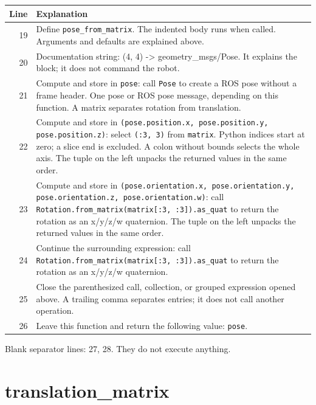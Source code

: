 \documentclass[11pt,a4paper]{book}
\begin{document}
\begin{longtable}{r p{}}

\textbf{Line} & \textbf{Explanation} \\ \hline \endhead

19 & Define \texttt{pose\_from\_matrix}. The indented body runs when called. Arguments and defaults are explained above. \\

20 & Documentation string: (4, 4) -> geometry\_msgs/Pose. It explains the block; it does not command the robot. \\

21 & Compute and store in \texttt{pose}: call \texttt{Pose} to create a ROS pose without a frame header. One pose or ROS pose message, depending on this function. A matrix separates rotation from translation. \\

22 & Compute and store in \texttt{(pose.position.x, pose.position.y, pose.position.z)}: select \texttt{(:3, 3)} from \texttt{matrix}. Python indices start at zero; a slice end is excluded. A colon without bounds selects the whole axis. The tuple on the left unpacks the returned values in the same order. \\

23 & Compute and store in \texttt{(pose.orientation.x, pose.orientation.y, pose.orientation.z, pose.orientation.w)}: call \texttt{Rotation.from\_matrix(matrix[:3, :3]).as\_quat} to return the rotation as an x/y/z/w quaternion. The tuple on the left unpacks the returned values in the same order. \\

24 & Continue the surrounding expression: call \texttt{Rotation.from\_matrix(matrix[:3, :3]).as\_quat} to return the rotation as an x/y/z/w quaternion. \\

25 & Close the parenthesized call, collection, or grouped expression opened above. A trailing comma separates entries; it does not call another operation. \\

26 & Leave this function and return the following value: \texttt{pose}. \\

\end{longtable}

Blank separator lines: 27, 28. They do not execute anything.

\section{translation\_matrix}
\end{document}
